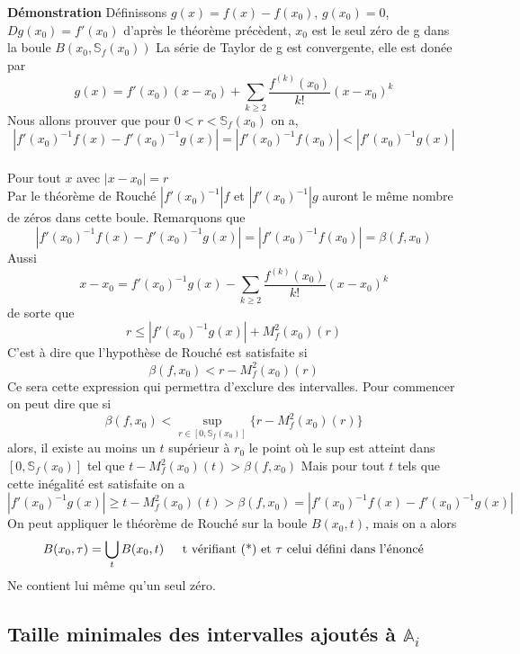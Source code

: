 \documentclass[a4paper,10.5pt]{article}
\begin{document}
	\noindent\textbf{Démonstration} Définissons $g(x)=f(x)-f(x_0)$, $g(x_0)=0$, $Dg(x_0)=f'(x_0)$ d'après le théorème précèdent, $x_0$ est le seul zéro de g dans la boule
	$B(x_0,\mathbb{S}_{f}(x_0))$
	La série de Taylor de g est convergente, elle est donée par
	\[g(x)=f'(x_0)(x-x_0)+ \sum_{k \geq 2}\frac{f^{(k)}(x_0)}{k!}(x-x_0)^k\]
	Nous allons prouver que pour $0<r<\mathbb{S}_{f}(x_0)$ on a,
	\[|f'(x_0)^{-1}f(x)-f'(x_0)^{-1}g(x)|=|f'(x_0)^{-1}f(x_0)|<|f'(x_0)^{-1}g(x)|\]
	\\
	Pour tout $x$ avec $|x-x_0|=r$
	\\
	Par le théorème de Rouché $|f'(x_0)^{-1}|f$ et $|f'(x_0)^{-1}|g$ auront le même nombre de zéros dans cette boule. Remarquons que 
	\[|f'(x_0)^{-1}f(x)-f'(x_0)^{-1}g(x)|=|f'(x_0)^{-1}f(x_0)|=\beta(f,x_0)\]
	Aussi
	\[x-x_0=f'(x_0)^{-1}g(x)-\sum_{k \geq 2}\frac{f^{(k)}(x_0)}{k!}(x-x_0)^k\]
	de sorte que
	\[r \leq |f'(x_0)^{-1}g(x)|+M_{f}^{2}(x_0)(r) \]
	C'est à dire que l'hypothèse de Rouché est satisfaite si
	\[\beta(f,x_0)<r-M_{f}^{2}(x_0)(r)\] 
	Ce sera cette expression qui permettra d'exclure des intervalles. Pour commencer on peut dire que si 
	\[\beta(f,x_0)< \sup_{r \in [0,\mathbb{S}_{f}(x_0)]}\{r-M_{f}^{2}(x_0)(r)\}\]
	alors, il existe au moins un $t$ supérieur à $r_0$ le point où le sup est atteint dans $[0,\mathbb{S}_{f}(x_0)]$ tel que $t-M_{f}^{2}(x_0)(t)>\beta(f,x_0)$
	Mais pour tout $t$ tels que cette inégalité est satisfaite on a
	\[|f'(x_0)^{-1}g(x)|\geq t-M_{f}^{2}(x_0)(t)>\beta(f,x_0)=|f'(x_0)^{-1}f(x)-f'(x_0)^{-1}g(x)| \tag{*}\]
	On peut appliquer le théorème de Rouché sur la boule $B(x_0,t)$, mais on a alors
 	\[B(x_0,\tau)=\bigcup_{t}B(x_0,t) \hspace{4mm} \text{ t vérifiant (*) et } \tau \text{ celui défini dans l'énoncé}\]
	 Ne contient lui même qu'un seul zéro.
	 
	
	
	\subsection{Taille minimales des intervalles ajoutés à $\mathbb{A}_i$}

	
\end{document}
